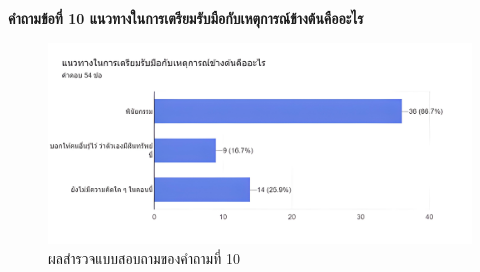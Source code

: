 \documentclass[12pt,oneside,openright,a4paper]{cpe-thai-project}
\begin{document}
\FloatBarrier
\bf คำถามข้อที่ 10 แนวทางในการเตรียมรับมือกับเหตุการณ์ข้างต้นคืออะไร\\
\begin{figure}[!thb]
			\centering
			\includegraphics[scale=0.1]{apprex10}
			\caption{ผลสำรวจแบบสอบถามของคำถามที่ 10}
		\end{figure}
\FloatBarrier



\end{document}
